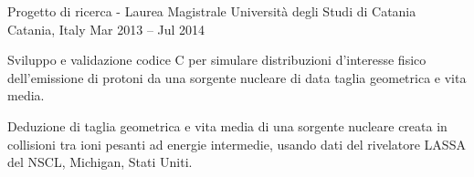   \begin{cventries}    
    \cventry
    {Progetto di ricerca - Laurea Magistrale}
    {Università degli Studi di Catania}
    {Catania, Italy}
    {Mar 2013 -- Jul 2014}
    {
    \begin{cvitems}
      \item Sviluppo e validazione codice C per simulare distribuzioni d'interesse fisico dell'emissione di protoni da una sorgente nucleare di data taglia geometrica e vita media. 
      \item Deduzione di taglia geometrica e vita media di una sorgente nucleare creata in collisioni tra ioni pesanti ad energie intermedie, usando dati del rivelatore LASSA del NSCL, Michigan, Stati Uniti.
    \end{cvitems}
    }
  \end{cventries}
